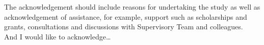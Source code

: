 

\begin{acknowledgements}
The acknowledgement should include reasons for undertaking the study as well as acknowledgement of assistance, for example, support such as scholarships and grants, consultations and discussions with Supervisory Team and colleagues.\\
And I would like to acknowledge\dots
\end{acknowledgements}
